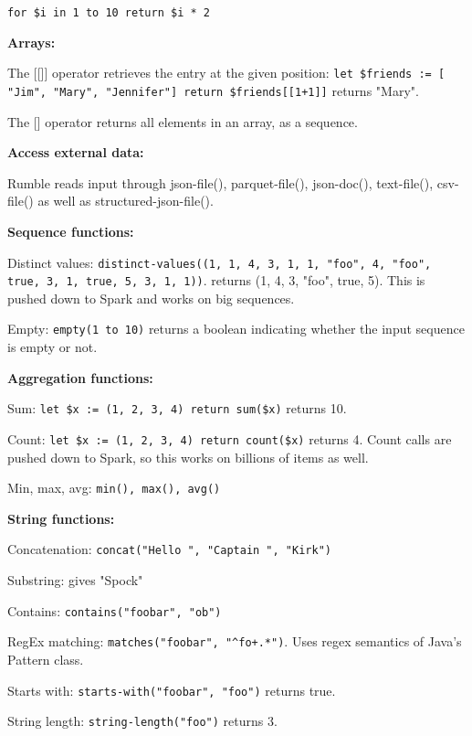 \documentclass[11pt,oneside,a4paper]{article}
\begin{document}
{\texttt{for \$i in 1 to 10 return \$i * 2}

\textbf{Arrays:}

The [[]] operator retrieves the entry at the given position: \texttt{let \$friends := [ "Jim", "Mary", "Jennifer"] return \$friends[[1+1]]} returns "Mary".

The [] operator returns all elements in an array, as a sequence.

\textbf{Access external data:}

Rumble reads input through json-file(), parquet-file(), json-doc(), text-file(), csv-file() as well as structured-json-file().

\textbf{Sequence functions:}

\begin{compactitem}
\item Distinct values: \texttt{distinct-values((1, 1, 4, 3, 1, 1, "foo", 4, "foo", true, 3, 1, true, 5, 3, 1, 1))}. returns (1, 4, 3, "foo", true, 5). This is pushed down to Spark and works on big sequences.
\item Empty: \texttt{empty(1 to 10)} returns a boolean indicating whether the input sequence is empty or not.
\end{compactitem}

\newpage

\textbf{Aggregation functions:}

\begin{compactitem}
\item Sum: \texttt{let \$x := (1, 2, 3, 4) return sum(\$x)} returns 10.
\item Count: \texttt{let \$x := (1, 2, 3, 4) return count(\$x)} returns 4. Count calls are pushed down to Spark, so this works on billions of items as well.
\item Min, max, avg: \texttt{min(), max(), avg()}
\end{compactitem}

\textbf{String functions:}

\begin{compactitem}
\item Concatenation: \texttt{concat("Hello ", "Captain ", "Kirk")}
\item Substring:  gives "Spock"
\item Contains: \texttt{contains("foobar", "ob")}
\item RegEx matching: \texttt{matches("foobar", "\string^fo+.*")}. Uses regex semantics of Java's Pattern class.
\item Starts with: \texttt{starts-with("foobar", "foo")} returns true.
\item String length: \texttt{string-length("foo")} returns 3.
\end{compactitem}


}
\end{document}
